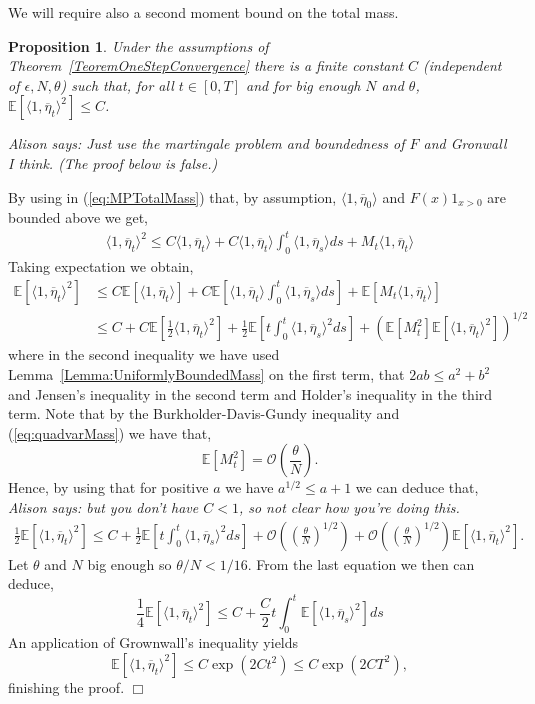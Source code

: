 \documentclass[12pt]{article}
\newenvironment {proof}{{\noindent\bf Proof }}{\hfill $\Box$ \medskip}
\newtheorem{proposition}[theorem]{Proposition}
\newcommand{\IE}{\mathbb E}
\newcommand{\comment}[1]{{\color{blue} \it #1}}
\begin{document}
We will require also a second moment bound on the total mass.

\begin{proposition}
Under the assumptions of Theorem~\ref{TeoremOneStepConvergence} there is a finite constant $C$ (independent of $\epsilon, N, \theta$) such that, for all $t \in [0,T]$ and for big enough $N$ and $\theta$, $\IE[ \langle 1, \overline{\eta}_t \rangle^2] \leq C$.\label{Prop:SecondMomentMass}
\end{proposition} 

\comment{Alison says: Just use the martingale problem and boundedness of $F$ and Gronwall I think. (The proof below is false.)}

\begin{proof}
By using in (\ref{eq:MPTotalMass}) that, by assumption, $\langle 1, \overline{\eta}_0 \rangle$  and $F(x)1_{x > 0}$ are bounded above we get,
\begin{align*}
 \langle 1, \overline{\eta}_t \rangle^2 \leq C \langle 1, \overline{\eta}_t \rangle + C\langle 1,\overline{\eta}_t \rangle \int_0^t \langle 1, \overline{\eta}_s\rangle ds + M_t \langle 1, \overline{\eta}_t \rangle \end{align*}
Taking expectation we obtain,
\begin{align*}
\IE[ \langle 1, \overline{\eta}_t \rangle^2 ]
    & \leq
    C \IE[\langle 1, \overline{\eta}_t \rangle] + C\IE[  \langle 1,\overline{\eta}_t \rangle \int_0^t \langle 1, \overline{\eta}_s\rangle ds ] + \IE[ M_t \langle 1, \overline{\eta}_t \rangle] \\
    & \leq
    C +
    C\IE[\frac{1}{2} \langle 1, \overline{\eta}_t\rangle^2] + \frac{1}{2} \IE[t \int_0^t \langle 1, \overline{\eta}_s \rangle^2 ds ] + (\IE[M_t^2] \IE[\langle 1, \overline{\eta}_t \rangle^2])^{1/2}
\end{align*}
where in the second inequality we have used Lemma~\ref{Lemma:UniformlyBoundedMass} on the first term, that $2ab \leq a^2 + b^2$ and Jensen's inequality in the second term and Holder's inequality in the third term. Note that by the Burkholder-Davis-Gundy inequality and (\ref{eq:quadvarMass}) we have that,
\[ \IE[ M_t^2 ] = \mathcal{O}\left( \frac{\theta}{N} \right). \]
Hence, by using that for positive $a$ we have $a^{1/2} \leq a+1$ we can deduce that,
\comment{Alison says: but you don't have $C < 1$, so not clear how you're doing this.}
\begin{align*}
\frac{1}{2} \IE[ \langle 1, \overline{\eta}_t \rangle^2 ] \leq C + \frac{1}{2} \IE[t \int_0^t \langle 1, \overline{\eta}_s \rangle^2 ds ] + \mathcal{O}\left( \left(\frac{\theta}{N}\right)^{1/2} \right) +\mathcal{O}\left( \left(\frac{\theta}{N}\right)^{1/2} \right) \IE[\langle 1, \overline{\eta}_t \rangle^2].
\end{align*}
Let $\theta$ and $N$ big enough so $\theta/N < 1/16$. From the last equation we then can deduce,
\[ \frac{1}{4}\IE[ \langle 1, \overline{\eta}_t \rangle^2 ] \leq C + \frac{C}{2} t \int_0^t\IE[\langle 1, \overline{\eta}_s \rangle^2 ] ds\]
An application of Grownwall's inequality yields
\[ \IE[ \langle 1, \overline{\eta}_t \rangle^2 ] \leq C \exp(2 C t^2) \leq C \exp(2 C T^2),  \]
finishing the proof.
\end{proof}
\end{document}
